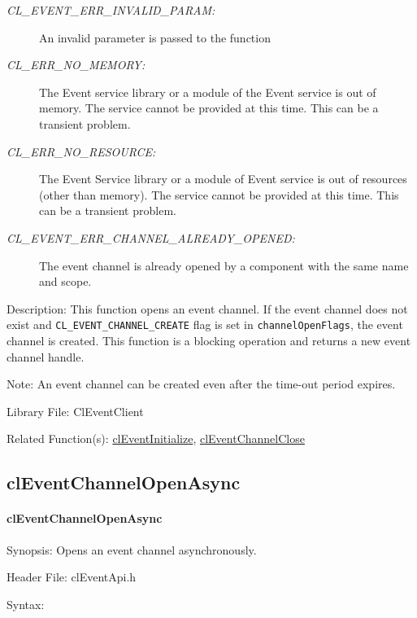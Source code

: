 \begin{flushleft}
\begin{Desc}
\begin{description}
\item[{\em CL\_\-EVENT\_\-ERR\_\-INVALID\_\-PARAM:}]An invalid parameter is passed to the function
\item[{\em CL\_\-ERR\_\-NO\_\-MEMORY:}]The Event service library or a module of the Event service is out of memory. The service cannot be 
provided at this time. This can be a transient problem.
\item[{\em CL\_\-ERR\_\-NO\_\-RESOURCE:}]The Event Service library or a module of Event service is out of resources (other than memory).
The service cannot be provided at this time. This can be a transient problem.
\item[{\em CL\_\-EVENT\_\-ERR\_\-CHANNEL\_\-ALREADY\_\-OPENED:}]The event channel is already opened by a component with the same name and scope.
\end{description}
\end{Desc}
\begin{Desc}
\item[Description:]This function opens an event channel. If the event channel does not exist and {\tt{CL\_\-EVENT\_\-CHANNEL\_\-CREATE}} flag is set in 
{\tt{channelOpenFlags}}, the event channel is created. This function is a blocking operation and returns a new event channel handle. \end{Desc}
\begin{Desc}
\item[Note:] 
An event channel can be created even after the time-out period expires.
\end{Desc}
\begin{Desc}
\item[Library File:]Cl\-Event\-Client\end{Desc}
\begin{Desc}
\item[Related Function(s):]\hyperlink{pageem101}{cl\-Event\-Initialize}, \hyperlink{pageem105}{cl\-Event\-Channel\-Close} \end{Desc}
\newpage


\subsection{clEventChannelOpenAsync}
\hypertarget{pageem104}{}\paragraph{cl\-Event\-Channel\-Open\-Async}\label{pageem104}
\begin{Desc}
\item[Synopsis:]Opens an event channel asynchronously.\end{Desc}
\begin{Desc}
\item[Header File:]clEventApi.h\end{Desc}
\begin{Desc}
\item[Syntax:]


\end{Desc}
\end{flushleft}
